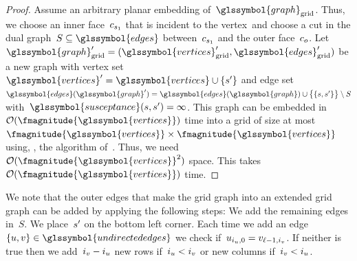 \begin{proof}
Assume an arbitrary planar embedding of~$\glssymbol{graph}_{\mathrm{grid}}$.
Thus, we choose an inner face~$c_{s_1}$ that is incident to the
vertex~\source and choose a cut in the dual graph~$S\subseteq\glssymbol{edges}$
between~$c_{s_1}$ and the outer face~$c_{o}$. Let~$
    \glssymbol{graph}_{\mathrm{grid}}' 
    =
    (
        \glssymbol{vertices}_{\mathrm{grid}}',
        \glssymbol{edges}_{\mathrm{grid}}'
    )
$ be a new graph with vertex set~$
    \glssymbol{vertices}' 
    =
    \glssymbol{vertices}
    \cup
    \{\source'\}
$ and edge set~$
    \glssymbol{edges}(\glssymbol{graph}') 
    =
    \glssymbol{edges}(\glssymbol{graph})
    \cup
    \big\{
        \{\source,\source'\}
    \big\}
    \setminus 
    S
$ with~$\glssymbol{susceptance} (\source,\source') = \infty$. This graph can be
embedded in~$
    \bigO(
        \fmagnitude{\glssymbol{vertices}}
    )
$ time into a grid of size at
most~$
    \fmagnitude{\glssymbol{vertices}}
    \times
    \fmagnitude{\glssymbol{vertices}}
$ using, \eg, the algorithm of~\textcite{Bie98}. Thus, we need~$
    \bigO(\fmagnitude{\glssymbol{vertices}}^2)
$ space.
This takes~$\bigO(\fmagnitude{\glssymbol{vertices}})$ time.
% 
\end{proof}
% 
% 
We note that the outer edges that make the grid graph into an extended grid
graph
can be added by applying the following steps: 
% 
We add the remaining edges in~$S$. We place~$s'$ on the bottom left
corner. Each time we add an edge~$
    \{\vertexa,\vertexb\}
    \in
    \glssymbol{undirectededges}
$ we check if~$u_{i_{u},0} = v_{\ell-1,i_{v}}$. If
neither is true then we add~$i_{v} - i_{u}$ new rows 
if~$i_{u}<i_{v}$ or new columns if~$i_{v}<i_{u}$.

